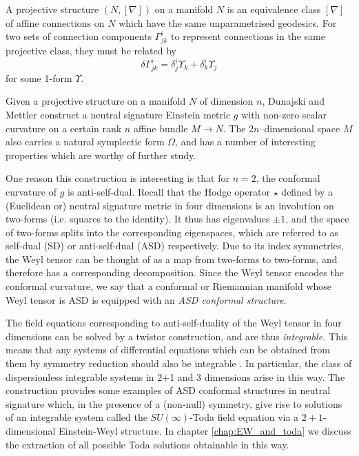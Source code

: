 \begin{defi} A projective structure $(N,[\nabla])$
on a manifold $N$ is an equivalence class $[\nabla]$ of affine connections
on $N$ which have the same unparametrised geodesics. For two sets
of connection components $\Gamma_{jk}^{i}$ to represent connections
in the same projective class, they must be related by
\begin{equation}
\delta\Gamma_{jk}^{i}=\delta_{j}^{i}\Upsilon_{k}+\delta_{k}^{i}\Upsilon_{j}\label{eq:proj_change}
\end{equation}
for some 1-form $\Upsilon.$
\end{defi}

Given a projective structure on a manifold $N$ of dimension $n$,
Dunajski and Mettler \cite{DM} construct a neutral signature Einstein metric $g$ with non-zero
scalar curvature on a certain rank $n$ affine bundle $M\rightarrow N$.
The $2n$--dimensional space $M$ also carries a natural symplectic form $\Omega$, and
has a number of interesting properties which are worthy of further
study.

One reason this construction is interesting is that for $n=2$, the conformal
curvature of $g$ is anti-self-dual. Recall that the Hodge operator
$\star$ defined by a (Euclidean or) neutral signature metric in four
dimensions is an involution on two-forms (i.e. squares to the identity).
It thus has eigenvalues $\pm1$, and the space of two-forms splits
into the corresponding eigenspaces, which are referred to as self-dual
(SD) or anti-self-dual (ASD) respectively. Due to its index symmetries,
the Weyl tensor can be thought of as a map from two-forms to two-forms,
and therefore has a corresponding decomposition. Since the Weyl tensor
encodes the conformal curvature, we say that a conformal or Riemannian
manifold whose Weyl tensor is ASD is equipped with an \textit{ASD
conformal structure}.

The field equations corresponding to anti-self-duality of the Weyl
tensor in four dimensions can be solved by a twistor construction,
and are thus \textit{integrable. }This means that any systems of differential
equations which can be obtained from them by symmetry reduction should
also be integrable \cite{Tod1995}. In particular, the class of dispersionless
integrable systems in 2+1 and 3 dimensions arise in this way. The
construction \cite{DM} provides some examples of
ASD conformal structures in neutral signature which, in the presence
of a (non-null) symmetry, give rise to solutions of an integrable
system called the $SU(\infty)$-Toda field equation via a $2+1$-dimensional
Einstein-Weyl structure. In chapter \ref{chap:EW_and_toda} we discuss the extraction
of all possible Toda solutions obtainable in this way.

